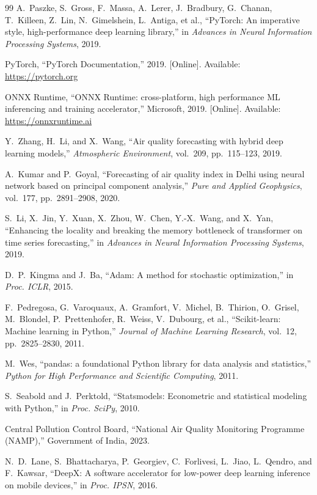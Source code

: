 \begin{thebibliography}{99}
A.~Paszke, S.~Gross, F.~Massa, A.~Lerer, J.~Bradbury, G.~Chanan, T.~Killeen, Z.~Lin, N.~Gimelshein, L.~Antiga, et al., ``PyTorch: An imperative style, high-performance deep learning library,'' in \textit{Advances in Neural Information Processing Systems}, 2019.

PyTorch, ``PyTorch Documentation,'' 2019. [Online]. Available: \url{https://pytorch.org}

ONNX Runtime, ``ONNX Runtime: cross-platform, high performance ML inferencing and training accelerator,'' Microsoft, 2019. [Online]. Available: \url{https://onnxruntime.ai}

Y.~Zhang, H.~Li, and X.~Wang, ``Air quality forecasting with hybrid deep learning models,'' \textit{Atmospheric Environment}, vol.~209, pp.~115--123, 2019.

A.~Kumar and P.~Goyal, ``Forecasting of air quality index in Delhi using neural network based on principal component analysis,'' \textit{Pure and Applied Geophysics}, vol.~177, pp.~2891--2908, 2020.

S.~Li, X.~Jin, Y.~Xuan, X.~Zhou, W.~Chen, Y.-X.~Wang, and X.~Yan, ``Enhancing the locality and breaking the memory bottleneck of transformer on time series forecasting,'' in \textit{Advances in Neural Information Processing Systems}, 2019.

D.~P.~Kingma and J.~Ba, ``Adam: A method for stochastic optimization,'' in \textit{Proc. ICLR}, 2015.

F.~Pedregosa, G.~Varoquaux, A.~Gramfort, V.~Michel, B.~Thirion, O.~Grisel, M.~Blondel, P.~Prettenhofer, R.~Weiss, V.~Dubourg, et al., ``Scikit-learn: Machine learning in Python,'' \textit{Journal of Machine Learning Research}, vol.~12, pp.~2825--2830, 2011.

M.~Wes, ``pandas: a foundational Python library for data analysis and statistics,'' \textit{Python for High Performance and Scientific Computing}, 2011.

S.~Seabold and J.~Perktold, ``Statsmodels: Econometric and statistical modeling with Python,'' in \textit{Proc. SciPy}, 2010.

Central Pollution Control Board, ``National Air Quality Monitoring Programme (NAMP),'' Government of India, 2023.

N.~D.~Lane, S.~Bhattacharya, P.~Georgiev, C.~Forlivesi, L.~Jiao, L.~Qendro, and F.~Kawsar, ``DeepX: A software accelerator for low-power deep learning inference on mobile devices,'' in \textit{Proc. IPSN}, 2016.


\end{thebibliography}
